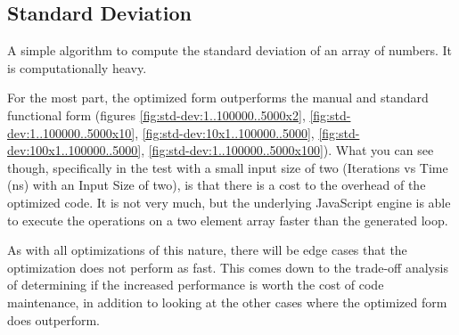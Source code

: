 \subsection{Standard Deviation}
A simple algorithm to compute the standard deviation of an array of numbers. It is computationally heavy.

For the most part, the optimized form outperforms the manual and standard functional form (figures \ref{fig:std-dev:1..100000..5000x2}, \ref{fig:std-dev:1..100000..5000x10}, \ref{fig:std-dev:10x1..100000..5000}, \ref{fig:std-dev:100x1..100000..5000}, \ref{fig:std-dev:1..100000..5000x100}).  What you can see though, specifically in the test with a small input size of two (Iterations vs Time (ns) with an Input Size of two), is that there is a cost to the overhead of the optimized code.  It is not very much, but the underlying JavaScript engine is able to execute the operations on a two element array faster than the generated  loop.  

As with all optimizations of this nature, there will be edge cases that the optimization does not perform as fast.  This comes down to the trade-off analysis of determining if the increased performance is worth the cost of code maintenance, in addition to looking at the other cases where the optimized form does outperform.